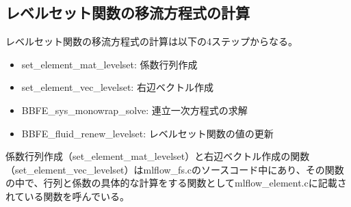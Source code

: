 \subsection{レベルセット関数の移流方程式の計算}
レベルセット関数の移流方程式の計算は以下の4ステップからなる。
\begin{itemize}
	\item set\_element\_mat\_levelset: 係数行列作成
	\item set\_element\_vec\_levelset: 右辺ベクトル作成
	\item BBFE\_sys\_monowrap\_solve: 連立一次方程式の求解
	\item BBFE\_fluid\_renew\_levelset: レベルセット関数の値の更新
\end{itemize}
係数行列作成（set\_element\_mat\_levelset）と右辺ベクトル作成の関数（set\_element\_vec\_levelset）はmlflow\_fs.cのソースコード中にあり、その関数の中で、行列と係数の具体的な計算をする関数としてmlflow\_element.cに記載されている関数を呼んでいる。

